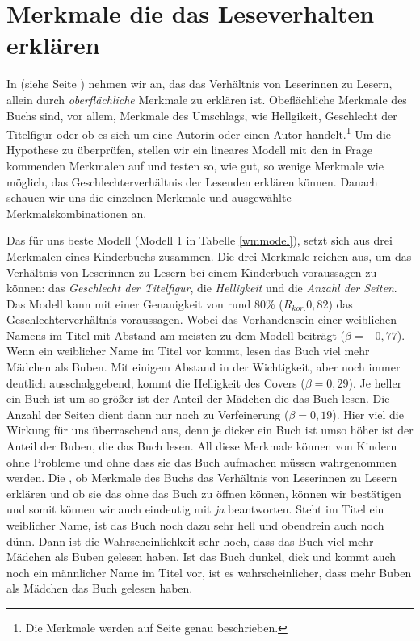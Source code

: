 \chapter{Merkmale die das Leseverhalten erklären}

In  (siehe Seite \pageref{h5}) nehmen wir an, das das
Verhältnis von Leserinnen zu Lesern, allein durch \emph{oberflächliche}
Merkmale zu erklären ist. Obeflächliche Merkmale des Buchs sind, vor
allem, Merkmale des Umschlags, wie Hellgikeit, Geschlecht der Titelfigur
oder ob es sich um eine Autorin oder einen Autor
handelt.\footnote{Die Merkmale werden auf Seite \pageref{meth.merkmale} genau beschrieben.}
Um die Hypothese zu überprüfen, stellen wir ein lineares Modell mit den
in Frage kommenden Merkmalen auf und testen so, wie gut, so wenige
Merkmale wie möglich, das Geschlechterverhältnis der Lesenden erklären
können. Danach schauen wir uns die einzelnen Merkmale und ausgewählte
Merkmalskombinationen an.

Das für uns beste Modell (Modell 1 in Tabelle \ref{wmmodel}), setzt sich
aus drei Merkmalen eines Kinderbuchs zusammen. Die drei Merkmale reichen
aus, um das Verhältnis von Leserinnen zu Lesern bei einem Kinderbuch
voraussagen zu können: das \emph{Geschlecht der Titelfigur}, die
\emph{Helligkeit} und die \emph{Anzahl der Seiten}. Das Modell kann mit
einer Genauigkeit von rund 80\% ($R_{kor.}0{,}82$) das
Geschlechterverhältnis voraussagen. Wobei das Vorhandensein einer
weiblichen Namens im Titel mit Abstand am meisten zu dem Modell beiträgt
($\beta=-0{,}77$). Wenn ein weiblicher Name im Titel vor kommt, lesen
das Buch viel mehr Mädchen als Buben. Mit einigem Abstand in der
Wichtigkeit, aber noch immer deutlich ausschalggebend, kommt die
Helligkeit des Covers ($\beta=0{,}29$). Je heller ein Buch ist um so
größer ist der Anteil der Mädchen die das Buch lesen. Die Anzahl der
Seiten dient dann nur noch zu Verfeinerung ($\beta=0{,}19$). Hier viel
die Wirkung für uns überraschend aus, denn je dicker ein Buch ist umso
höher ist der Anteil der Buben, die das Buch lesen. All diese Merkmale
können von Kindern ohne Probleme und ohne dass sie das Buch aufmachen
müssen wahrgenommen werden. Die , ob Merkmale des Buchs das
Verhältnis von Leserinnen zu Lesern erklären und ob sie das ohne das
Buch zu öffnen können, können wir bestätigen und somit können wir auch
 eindeutig mit \emph{ja} beantworten. Steht im Titel
ein weiblicher Name, ist das Buch noch dazu sehr hell und obendrein auch
noch dünn. Dann ist die Wahrscheinlichkeit sehr hoch, dass das Buch viel
mehr Mädchen als Buben gelesen haben. Ist das Buch dunkel, dick und
kommt auch noch ein männlicher Name im Titel vor, ist es
wahrscheinlicher, dass mehr Buben als Mädchen das Buch gelesen haben.

